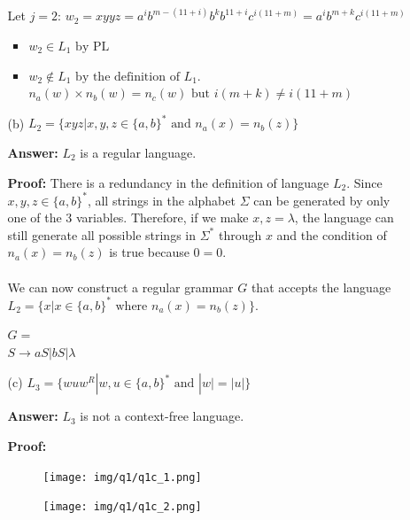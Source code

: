 \documentclass[12pt]{article}
\begin{document}
\begin{spacing}{1.5}
\begin{enumerate}
\begin{enumerate}
                              Let $j=2$:
                              $w_2=xyyz=a^ib^{m-(11+i)}b^kb^{11+i}c^{i(11+m)}=a^ib^{m+k}c^{i(11+m)}$

                              \begin{itemize}
                                    \item $w_2 \in L_1 \text{ by PL}$
                                    \item $w_2 \not\in L_1 \text{ by the definition of }L_1.$ $n_a(w) \times n_b(w)=n_c(w) \text{ but } i(m+k) \not=i(11+m)$
                              \end{itemize}

                              \newpage
                        \item[(b)] $L_2 = \{xyz | x,y,z \in \{a,b \}^* \text{ and } n_a(x)=n_b(z) \}$

                              \textbf{Answer:} $L_2$ is a regular language.

                              \textbf{Proof:} There is a redundancy in the definition of language $L_2$. Since $x,y,z \in \{a,b\}^*$, all strings in the alphabet $\Sigma$ can be generated by only one of the 3 variables. Therefore, if we make $x,z = \lambda$, the language can still generate all possible strings in $\Sigma^*$ through $x$ and the condition of $n_a(x)=n_b(z)$ is true because $0=0$.
                              \\
                              \\
                              We can now construct a regular grammar $G$ that accepts the language $L_2=\{x | x \in \{a,b\}^* \text{ where } n_a(x)=n_b(z)\}$.

                              $G =$ \\
                              $S \rightarrow aS | bS | \lambda$

                              \newpage
                        \item[(c)] $L_3 = \{wuw^R | w,u \in \{a,b\}^* \text{ and } |w|=|u| \}$

                              \textbf{Answer:} $L_3$ is not a context-free language.

                              \textbf{Proof:}
                              \begin{figure}[h!]
                                    \centering
                                    \texttt{[image: img/q1/q1c\_1.png]}
                              \end{figure}
                              \begin{figure}[h!]
                                    \centering
                                    \texttt{[image: img/q1/q1c\_2.png]}
                              \end{figure}
                  \end{enumerate}


\end{enumerate}
\end{spacing}
\end{document}
